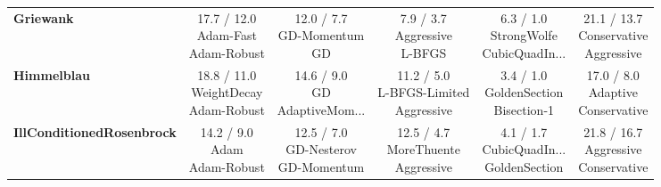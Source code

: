\documentclass{article}
\begin{document}
\begin{longtable}{lccccc}
\textbf{Griewank} &  \makecell{17.7 / 12.0 \\ \scriptsize{Adam-Fast} \\ \scriptsize{Adam-Robust}}&  \makecell{12.0 / 7.7 \\ \scriptsize{GD-Momentum} \\ \scriptsize{GD}}&  \makecell{7.9 / 3.7 \\ \scriptsize{Aggressive} \\ \scriptsize{L-BFGS}}& \cellcolor{green!20} \makecell{6.3 / 1.0 \\ \scriptsize{StrongWolfe} \\ \scriptsize{CubicQuadIn...}}& \cellcolor{red!15} \makecell{21.1 / 13.7 \\ \scriptsize{Conservative} \\ \scriptsize{Aggressive}} \\
\textbf{Himmelblau} & \cellcolor{red!15} \makecell{18.8 / 11.0 \\ \scriptsize{WeightDecay} \\ \scriptsize{Adam-Robust}}&  \makecell{14.6 / 9.0 \\ \scriptsize{GD} \\ \scriptsize{AdaptiveMom...}}&  \makecell{11.2 / 5.0 \\ \scriptsize{L-BFGS-Limited} \\ \scriptsize{Aggressive}}& \cellcolor{green!20} \makecell{3.4 / 1.0 \\ \scriptsize{GoldenSection} \\ \scriptsize{Bisection-1}}&  \makecell{17.0 / 8.0 \\ \scriptsize{Adaptive} \\ \scriptsize{Conservative}} \\
\textbf{IllConditionedRosenbrock} &  \makecell{14.2 / 9.0 \\ \scriptsize{Adam} \\ \scriptsize{Adam-Robust}}&  \makecell{12.5 / 7.0 \\ \scriptsize{GD-Nesterov} \\ \scriptsize{GD-Momentum}}&  \makecell{12.5 / 4.7 \\ \scriptsize{MoreThuente} \\ \scriptsize{Aggressive}}& \cellcolor{green!20} \makecell{4.1 / 1.7 \\ \scriptsize{CubicQuadIn...} \\ \scriptsize{GoldenSection}}& \cellcolor{red!15} \makecell{21.8 / 16.7 \\ \scriptsize{Aggressive} \\ \scriptsize{Conservative}} \\

\end{longtable}
\end{document}
